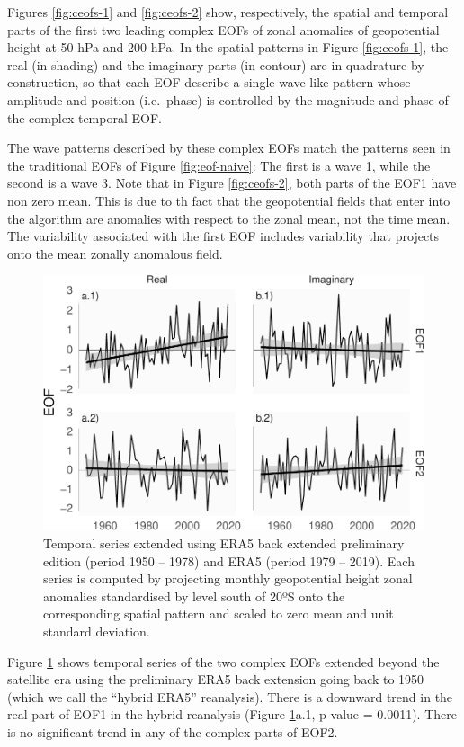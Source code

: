 \documentclass[smallextended]{svjour3}       %
\begin{document}
Figures \ref{fig:ceofs-1} and \ref{fig:ceofs-2} show, respectively, the spatial and temporal parts of the first two leading complex EOFs of zonal anomalies of geopotential height at 50 hPa and 200 hPa. In the spatial patterns in Figure \ref{fig:ceofs-1}, the real (in shading) and the imaginary parts (in contour) are in quadrature by construction, so that each EOF describe a single wave-like pattern whose amplitude and position (i.e.~phase) is controlled by the magnitude and phase of the complex temporal EOF.

The wave patterns described by these complex EOFs match the patterns seen in the traditional EOFs of Figure \ref{fig:eof-naive}: The first is a wave 1, while the second is a wave 3. Note that in Figure \ref{fig:ceofs-2}, both parts of the EOF1 have non zero mean. This is due to th fact that the geopotential fields that enter into the algorithm are anomalies with respect to the zonal mean, not the time mean. The variability associated with the first EOF includes variability that projects onto the mean zonally anomalous field.



\begin{figure}
\centering
\includegraphics{../figures/extended-series-1.pdf}
\caption{\label{fig:extended-series}Temporal series extended using ERA5 back extended preliminary edition (period 1950 -- 1978) and ERA5 (period 1979 -- 2019). Each series is computed by projecting monthly geopotential height zonal anomalies standardised by level south of 20ºS onto the corresponding spatial pattern and scaled to zero mean and unit standard deviation.}
\end{figure}

Figure \ref{fig:extended-series} shows temporal series of the two complex EOFs extended beyond the satellite era using the preliminary ERA5 back extension going back to 1950 (which we call the ``hybrid ERA5'' reanalysis). There is a downward trend in the real part of EOF1 in the hybrid reanalysis (Figure \ref{fig:extended-series}a.1, p-value = 0.0011). There is no significant trend in any of the complex parts of EOF2.
\end{document}
